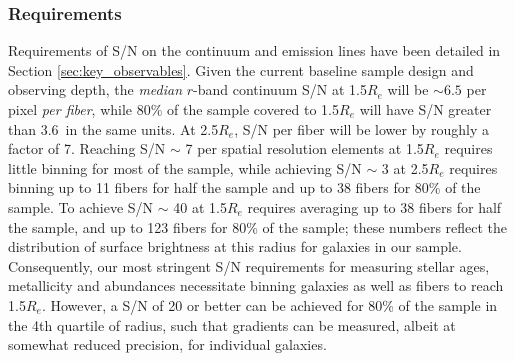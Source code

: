 \documentclass[preprint,11pt]{aastex}
\begin{document}
\subsubsection{Requirements}

Requirements of S/N on the continuum and emission lines have been detailed in 
Section \ref{sec:key_observables}.
Given the current baseline sample design and observing depth, the
        {\it median} $r$-band continuum S/N at 1.5$R_{e}$ will be
        $\sim 6.5$ per pixel {\it per fiber}, while 80\% of the sample
        covered to 1.5$R_{e}$ will have S/N greater than 3.6\ in the same
        units. At 2.5$R_{e}$, S/N per fiber will be lower by roughly a
        factor of 7. Reaching S/N $\sim$ 7 per spatial resolution elements at 1.5$R_{e}$ requires
        little binning for most of the sample, while achieving S/N
        $\sim$ 3 at 2.5$R_{e}$ requires binning up to 11 fibers for
        half the sample and up to 38 fibers for 80\% of the sample.
        To achieve S/N $\sim$ 40 at 1.5$R_{e}$ requires averaging up
        to 38 fibers for half the sample, and up to 123 fibers for
        80\% of the sample; these numbers reflect the distribution of
        surface  brightness at this radius for galaxies in our
        sample. Consequently, our most stringent S/N requirements for
        measuring stellar ages, metallicity and abundances necessitate
        binning galaxies as well as fibers to reach
        1.5$R_{e}$. However, a S/N of 20 or better can be achieved for
        80\% of the sample in the 4th quartile of radius, such that
        gradients can be measured, albeit at somewhat reduced
        precision, for individual galaxies.
\end{document}
